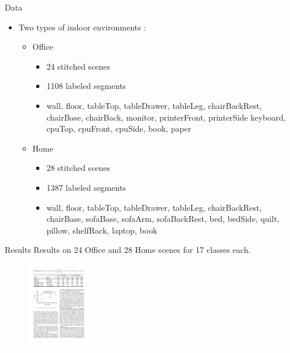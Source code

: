 \documentclass{beamer}
\begin{document}
\begin{frame}{Data}
\begin{itemize}
   \item Two types of indoor environments : 
   \begin{itemize}
   \item Office 
   	\begin{itemize}
	\item 24 stitched scenes
	\item 1108 labeled segments
	\item wall, floor, tableTop, tableDrawer, tableLeg, chairBackRest, chairBase, chairBack, monitor, printerFront, printerSide keyboard, cpuTop, cpuFront, cpuSide, book, paper
	\end{itemize}
   \item Home
   	\begin{itemize}
   	\item  28 stitched scenes
	\item 1387 labeled segments
	\item wall, floor, tableTop, tableDrawer, tableLeg, chairBackRest, chairBase, sofaBase, sofaArm, sofaBackRest, bed, bedSide, quilt, pillow, shelfRack, laptop, book 
	\end{itemize} 
\end{itemize}
\end{itemize}
\end{frame}

\begin{frame}{Results }
Results on 24 Office and 28 Home scenes for 17 classes each.
\begin{figure}[t!]
\includegraphics[width=\linewidth,height=1.5in]{results_table.pdf}
\end{figure}
\end{frame}
\end{document}
